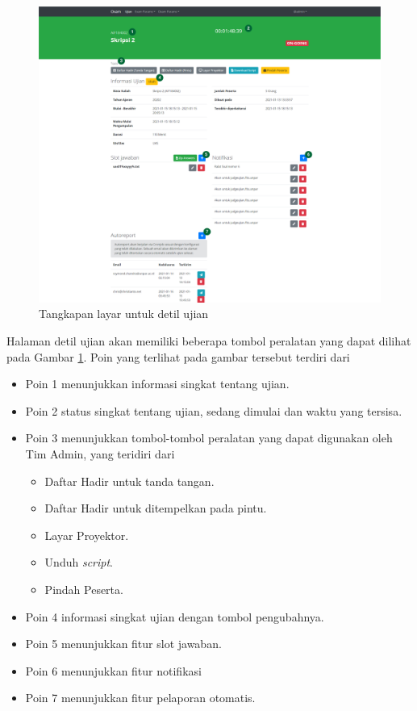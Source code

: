     \begin{figure}
        \centering
        \includegraphics[width=0.7\paperwidth]{Gambar/implemented-interface/admin/ujian-detail.png}
        \caption{Tangkapan layar untuk detil ujian}
        \label{fig:screenshot-admin-exam-detail}
    \end{figure}
    Halaman detil ujian akan memiliki beberapa tombol peralatan yang dapat dilihat pada Gambar
    \ref{fig:screenshot-admin-exam-detail}. Poin yang terlihat pada gambar tersebut terdiri dari
    \begin{itemize}
        \item Poin 1 menunjukkan informasi singkat tentang ujian.
        \item Poin 2 status singkat tentang ujian, sedang dimulai dan waktu yang tersisa.
        \item Poin 3 menunjukkan tombol-tombol peralatan yang dapat digunakan oleh Tim Admin, yang
            teridiri dari
            \begin{itemize}
                \item Daftar Hadir untuk tanda tangan.
                \item Daftar Hadir untuk ditempelkan pada pintu.
                \item Layar Proyektor.
                \item Unduh \textit{script}.
                \item Pindah Peserta.
            \end{itemize}
        \item Poin 4 informasi singkat ujian dengan tombol pengubahnya.
        \item Poin 5 menunjukkan fitur slot jawaban.
        \item Poin 6 menunjukkan fitur notifikasi
        \item Poin 7 menunjukkan fitur pelaporan otomatis.
    \end{itemize}
    
